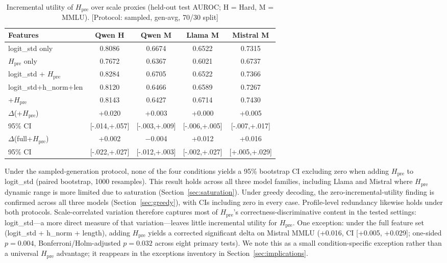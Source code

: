 \documentclass{ieeeaccess}
\newcommand{\Hpre}{H_{\text{pre}}}
\begin{document}
\begin{table}[!ht]
\centering
\caption{Incremental utility of $\Hpre$ over scale proxies (held-out test AUROC; H = Hard, M = MMLU). [Protocol: sampled, gen-avg, 70/30 split]}
\label{tab:incremental}
\scriptsize
\setlength{\tabcolsep}{1pt}
\begin{tabular}{l cccc}
\toprule
Features & Qwen H & Qwen M & Llama M & Mistral M \\
\midrule
logit\_std only & 0.8086 & 0.6674 & 0.6522 & 0.7315 \\
$\Hpre$ only & 0.7672 & 0.6367 & 0.6021 & 0.6737 \\
logit\_std + $\Hpre$ & 0.8284 & 0.6705 & 0.6522 & 0.7366 \\
logit\_std+h\_norm+len & 0.8120 & 0.6466 & 0.6589 & 0.7267 \\
+$\Hpre$ & 0.8143 & 0.6427 & 0.6714 & 0.7430 \\
\midrule
$\Delta$(+$\Hpre$) & +0.020 & +0.003 & +0.000 & +0.005 \\
95\% CI & [{-}.014,{+}.057] & [{-}.003,{+}.009] & [{-}.006,{+}.005] & [{-}.007,{+}.017] \\
$\Delta$(full+$\Hpre$) & +0.002 & $-$0.004 & +0.012 & +0.016 \\
95\% CI & [{-}.022,{+}.027] & [{-}.012,{+}.003] & [{-}.002,{+}.027] & [{+}.005,{+}.029] \\
\bottomrule
\end{tabular}
\end{table}

Under the sampled-generation protocol, none of the four conditions yields a 95\% bootstrap CI excluding zero when adding $\Hpre$ to logit\_std (paired bootstrap, 1000 resamples). This result holds across all three model families, including Llama and Mistral where $\Hpre$ dynamic range is more limited due to saturation (Section~\ref{sec:saturation}). Under greedy decoding, the zero-incremental-utility finding is confirmed across all three models (Section~\ref{sec:greedy}), with CIs including zero in every case. Profile-level redundancy likewise holds under both protocols. Scale-correlated variation therefore captures most of $\Hpre$'s correctness-discriminative content in the tested settings: logit\_std---a more direct measure of that variation---leaves little incremental utility for $\Hpre$. One exception: under the full feature set (logit\_std + h\_norm + length), adding $\Hpre$ yields a corrected significant delta on Mistral MMLU (+0.016, CI [+0.005, +0.029]; one-sided $p=0.004$, Bonferroni/Holm-adjusted $p=0.032$ across eight primary tests). We note this as a small condition-specific exception rather than a universal $\Hpre$ advantage; it reappears in the exceptions inventory in Section~\ref{sec:implications}.
\end{document}
